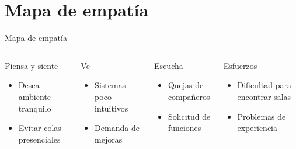 \documentclass[10pt]{beamer}
\begin{document}
\section{Mapa de empatía}
\begin{frame}{Mapa de empatía}
\begin{columns}[T]
\begin{block}{Piensa y siente}
\begin{itemize}
\item Desea ambiente tranquilo
\item Evitar colas presenciales
\end{itemize}
\end{block}

\begin{block}{Ve}
\begin{itemize}
\item Sistemas poco intuitivos
\item Demanda de mejoras
\end{itemize}
\end{block}

\begin{block}{Escucha}
\begin{itemize}
\item Quejas de compañeros
\item Solicitud de funciones
\end{itemize}
\end{block}

\begin{block}{Esfuerzos}
\begin{itemize}
\item Dificultad para encontrar salas
\item Problemas de experiencia
\end{itemize}
\end{block}
\end{columns}
\end{frame}
\end{document}
